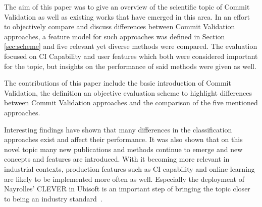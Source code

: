 
The aim of this paper was to give an overview of the scientific topic of Commit Validation as well as existing works that have emerged in this area. In an effort to objectively compare and discuss differences between Commit Validation approaches, a feature model for such approaches was defined in Section \ref{sec:scheme} and five relevant yet diverse methods were compared. The evaluation focused on CI Capability and user features which both were considered important for the topic, but insights on the performance of said methods were given as well.

The contributions of this paper include the basic introduction of Commit Validation, the definition an objective evaluation scheme to highlight differences between Commit Validation approaches and the comparison of the five mentioned approaches.

Interesting findings have shown that many differences in the classification approaches exist and affect their performance. It was also shown that on this novel topic many new publications and methods continue to emerge and new concepts and features are introduced. With it becoming more relevant in industrial contexts, production features such as CI capability and online learning are likely to be implemented more often as well. Especially the deployment of Nayrolles' CLEVER in Ubisoft is an important step of bringing the topic closer to being an industry standard~\cite{Nayrolles2018}.

